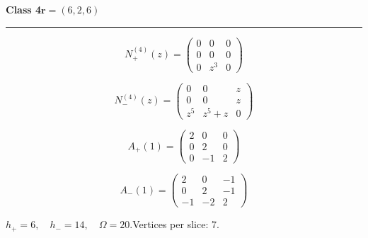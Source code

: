 \noindent\begin{minipage}{\linewidth}
\noindent\textbf{Class 4}\hfill $\symbf{r}=(6,2,6)$
\par\smallskip\noindent\textcolor{rulegray}{\rule{\linewidth}{0.3pt}}
\begin{minipage}[c]{0.495\linewidth}\centering\fontsize{10.5}{13}\selectfont
\setlength{\abovedisplayskip}{3pt}\setlength{\belowdisplayskip}{3pt}
\setlength{\abovedisplayshortskip}{3pt}\setlength{\belowdisplayshortskip}{3pt}
\setlength{\arraycolsep}{3.5pt}\renewcommand{\arraystretch}{1.18}
\[N_{+}^{(4)}(z)=\begin{pmatrix}0 & 0 & 0\\0 & 0 & 0\\0 & z^{3} & 0\end{pmatrix}\]
\end{minipage}%
\begin{minipage}[c]{0.495\linewidth}\centering\fontsize{10.5}{13}\selectfont
\setlength{\abovedisplayskip}{3pt}\setlength{\belowdisplayskip}{3pt}
\setlength{\abovedisplayshortskip}{3pt}\setlength{\belowdisplayshortskip}{3pt}
\setlength{\arraycolsep}{3.5pt}\renewcommand{\arraystretch}{1.18}
\[N_{-}^{(4)}(z)=\begin{pmatrix}0 & 0 & z\\0 & 0 & z\\z^{5} & z^{5} + z & 0\end{pmatrix}\]
\end{minipage}%
\par\noindent
\begin{minipage}[c]{0.495\linewidth}\centering\fontsize{10.5}{13}\selectfont
\setlength{\abovedisplayskip}{3pt}\setlength{\belowdisplayskip}{3pt}
\setlength{\abovedisplayshortskip}{3pt}\setlength{\belowdisplayshortskip}{3pt}
\setlength{\arraycolsep}{3.5pt}\renewcommand{\arraystretch}{1.18}
\[A_{+}(1)=\begin{pmatrix}2 & 0 & 0\\0 & 2 & 0\\0 & -1 & 2\end{pmatrix}\]
\end{minipage}%
\begin{minipage}[c]{0.495\linewidth}\centering\fontsize{10.5}{13}\selectfont
\setlength{\abovedisplayskip}{3pt}\setlength{\belowdisplayskip}{3pt}
\setlength{\abovedisplayshortskip}{3pt}\setlength{\belowdisplayshortskip}{3pt}
\setlength{\arraycolsep}{3.5pt}\renewcommand{\arraystretch}{1.18}
\[A_{-}(1)=\begin{pmatrix}2 & 0 & -1\\0 & 2 & -1\\-1 & -2 & 2\end{pmatrix}\]
\end{minipage}%
\par\smallskip\noindent\small $h_+=6,\quad h_-=14,\quad \Omega=20.$\quad Vertices per slice: 7.
\end{minipage}\par\vfill
\clearpage

